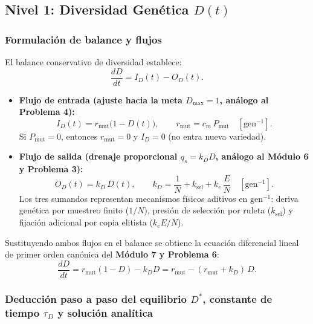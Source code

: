 \documentclass[11pt,a4paper]{article}
\begin{document}
\subsection{Nivel 1: Diversidad Gen\'etica $D(t)$}

\subsubsection{Formulaci\'on de balance y flujos}
El balance conservativo de diversidad establece:
\begin{equation}
\frac{dD}{dt} = I_D(t) - O_D(t).
\end{equation}
\begin{itemize}[leftmargin=1.5em]
    \item \textbf{Flujo de entrada (ajuste hacia la meta $D_{\max} = 1$, an\'alogo al Problema 4):}
    \begin{equation}
    I_D(t) = r_{\text{mut}}\big(1 - D(t)\big), \qquad r_{\text{mut}} = c_m\,P_{\text{mut}} \quad [\text{gen}^{-1}].
    \end{equation}
    Si $P_{\text{mut}} = 0$, entonces $r_{\text{mut}} = 0$ y $I_D = 0$ (no entra nueva variedad).
    \item \textbf{Flujo de salida (drenaje proporcional $q_s = k_D D$, an\'alogo al M\'odulo 6 y Problema 3):}
    \begin{equation}
    O_D(t) = k_D\,D(t), \qquad k_D = \frac{1}{N} + k_{\text{sel}} + k_e\,\frac{E}{N} \quad [\text{gen}^{-1}].
    \end{equation}
    Los tres sumandos representan mecanismos f\'isicos aditivos en $\text{gen}^{-1}$: deriva gen\'etica por muestreo finito ($1/N$), presi\'on de selecci\'on por ruleta ($k_{\text{sel}}$) y fijaci\'on adicional por copia elitista ($k_e E/N$).
\end{itemize}

Sustituyendo ambos flujos en el balance se obtiene la ecuaci\'on diferencial lineal de primer orden can\'onica del \textbf{M\'odulo 7 y Problema 6}:
\begin{equation}
\frac{dD}{dt} = r_{\text{mut}}(1 - D) - k_D D = r_{\text{mut}} - (r_{\text{mut}} + k_D)\,D.
\label{eq:ode_D}
\end{equation}

\subsubsection{Deducci\'on paso a paso del equilibrio $D^*$, constante de tiempo $\tau_D$ y soluci\'on anal\'itica}
\end{document}
